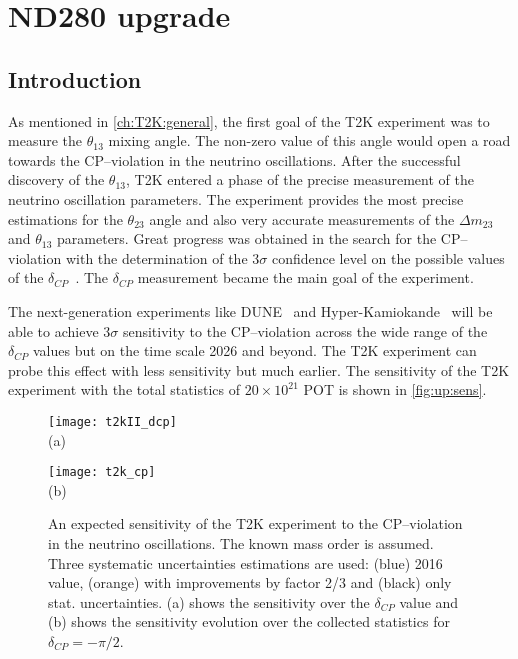 \documentclass[../main.tex]{subfiles}
\begin{document}
\renewcommand{\labelitemi}{\ding{226}}
\renewcommand{\labelitemii}{\ding{227}}

\part{ND280 upgrade}
\label{pt:up}

\chapter{Introduction}
\label{ch:up:motif}
As mentioned in \autoref{ch:T2K:general}, the first goal of the T2K experiment was to measure the $\theta_{13}$ mixing angle. The non-zero value of this angle would open a road towards the CP--violation in the neutrino oscillations. After the successful discovery of the $\theta_{13}$, T2K entered a phase of the precise measurement of the neutrino oscillation parameters. The experiment provides the most precise estimations for the $\theta_{23}$ angle and also very accurate measurements of the $\Delta m_{23}$ and $\theta_{13}$ parameters. Great progress was obtained in the search for the CP--violation with the determination of the 3$\sigma$ confidence level on the possible values of the $\delta_{CP}$~\cite{Abe2020n}. The $\delta_{CP}$ measurement became the main goal of the experiment.

The next-generation experiments like DUNE~\cite{Acciarri2016} and Hyper-Kamiokande~\cite{Proto-Collaboration2018} will be able to achieve 3$\sigma$ sensitivity to the CP--violation across the wide range of the $\delta_{CP}$ values but on the time scale 2026 and beyond. The T2K experiment can probe this effect with less sensitivity but much earlier. The sensitivity of the T2K experiment with the total statistics of $20\times10^{21}$ POT is shown in \autoref{fig:up:sens}.

\begin{figure}[!ht]
  \centering
  \begin{minipage}{0.49\linewidth}
    \centering
    \texttt{[image: t2kII\_dcp]} \\ (a)
  \end{minipage}
  \begin{minipage}{0.49\linewidth}
    \centering
    \texttt{[image: t2k\_cp]} \\ (b)
  \end{minipage}
    \caption{An expected sensitivity of the T2K experiment to the CP--violation in the neutrino oscillations. The known mass order is assumed. Three systematic uncertainties estimations are used: (blue) 2016 value, (orange) with improvements by factor 2/3 and (black) only stat. uncertainties. (a) shows the sensitivity over the $\delta_{CP}$ value and (b) shows the sensitivity evolution over the collected statistics for $\delta_{CP}=-\pi/2$.}
    \label{fig:up:sens}
\end{figure}
\end{document}
